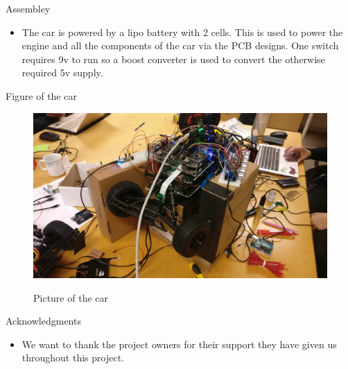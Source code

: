 \documentclass[final,hyperref={pdfpagelabels=false}]{beamer}
\begin{document}
\begin{frame}[t]
\begin{columns}[t]
\begin{column}{.465\textwidth}
\begin{block}{Assembley}
\begin{itemize}
            
            \item The car is powered by a lipo battery with 2 cells. This is used to power the engine and all the components of the car via the PCB designs. One switch requires 9v to run so a boost converter is used to convert the otherwise required 5v supply.
              
        \end{itemize}
    
    \end{block}
\begin{block}{Figure of the car}
    \begin{figure}
        \includegraphics[width=1\linewidth]{car1.jpg}
        \label{fig:car1}
        \caption{Picture of the car}
    \end{figure}
\end{block}


%
%



\begin{block}{Acknowledgments}

\begin{itemize}
\item We want to thank the project owners for their support they have given us throughout this project. 
\end{itemize}


\end{block}
\end{column}
\end{columns}
\end{frame}
\end{document}
